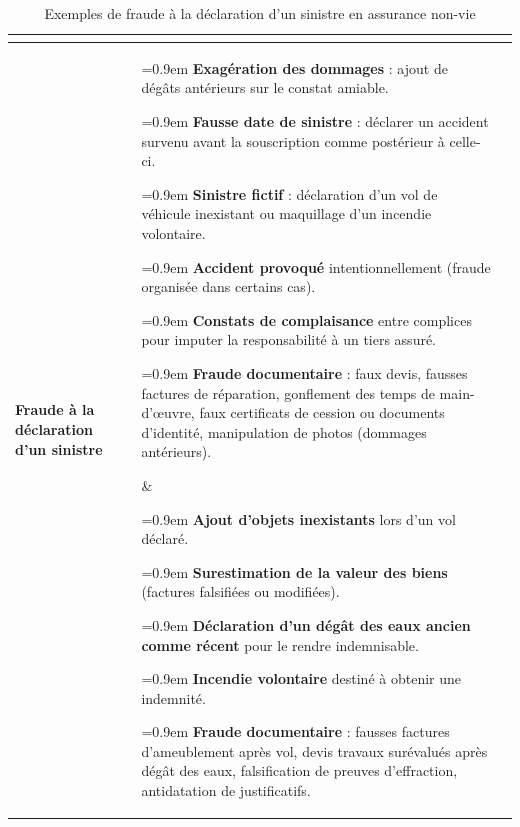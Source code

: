 \begin{table}[H]
    \centering
    \renewcommand{\arraystretch}{1.3}
    \setlength{\extrarowheight}{2pt}
    \renewcommand\tabularxcolumn[1]{m{#1}}   %
    \newcommand{\padV}{6pt}                  %
    \newcommand{\hautCell}{\vspace*{\padV}}
    \newcommand{\basCell}{\vspace*{\dimexpr\padV-4pt\relax}}
    \newcommand{\puce}[1]{%
        \leavevmode\hspace{0.3em}%
        \parbox[t]{\dimexpr\linewidth-0.9em\relax}{%
            \hangindent=0.9em\hangafter=1%
            \makebox[0.9em][l]{$\bullet$}#1\par}%
        \vspace{4pt}%
    }
    \begin{tabularx}{\textwidth}{%
        |>{\centering\arraybackslash}m{2.4cm}%
        |>{\raggedright\arraybackslash}X%
        |>{\raggedright\arraybackslash}X|}
        \hline
        \rowcolor{accenture}
        \textcolor{white}{\textbf{}}
        & \multicolumn{1}{c|}{\textcolor{white}{\textbf{Assurance automobile}}}
        & \multicolumn{1}{c|}{\textcolor{white}{\textbf{Assurance habitation}}} \\
        \hline
        \textbf{Fraude à la déclaration d'un sinistre}
        &
        \hautCell
        \puce{\textbf{Exagération des dommages} : ajout de dégâts antérieurs sur le constat amiable.}
        \puce{\textbf{Fausse date de sinistre} : déclarer un accident survenu avant la souscription comme postérieur à celle-ci.}
        \puce{\textbf{Sinistre fictif} : déclaration d'un vol de véhicule inexistant ou maquillage d'un incendie volontaire.}
        \puce{\textbf{Accident provoqué} intentionnellement (fraude organisée dans certains cas).}
        \puce{\textbf{Constats de complaisance} entre complices pour imputer la responsabilité à un tiers assuré.}
        \puce{\textbf{Fraude documentaire} : faux devis, fausses factures de réparation, gonflement des temps de main-d'œuvre, faux certificats de cession ou documents d'identité, manipulation de photos (dommages antérieurs).}%
        \basCell
        &
        \hautCell
        \puce{\textbf{Ajout d'objets inexistants} lors d'un vol déclaré.}
        \puce{\textbf{Surestimation de la valeur des biens} (factures falsifiées ou modifiées).}
        \puce{\textbf{Déclaration d'un dégât des eaux ancien comme récent} pour le rendre indemnisable.}
        \puce{\textbf{Incendie volontaire} destiné à obtenir une indemnité.}
        \puce{\textbf{Fraude documentaire} : fausses factures d'ameublement après vol, devis travaux surévalués après dégât des eaux, falsification de preuves d'effraction, antidatation de justificatifs.}%
        \basCell
        \\
        \hline
    \end{tabularx}
    \caption{Exemples de fraude à la déclaration d'un sinistre en assurance non-vie}
    \label{tab:fraude-declaration}
\end{table}

